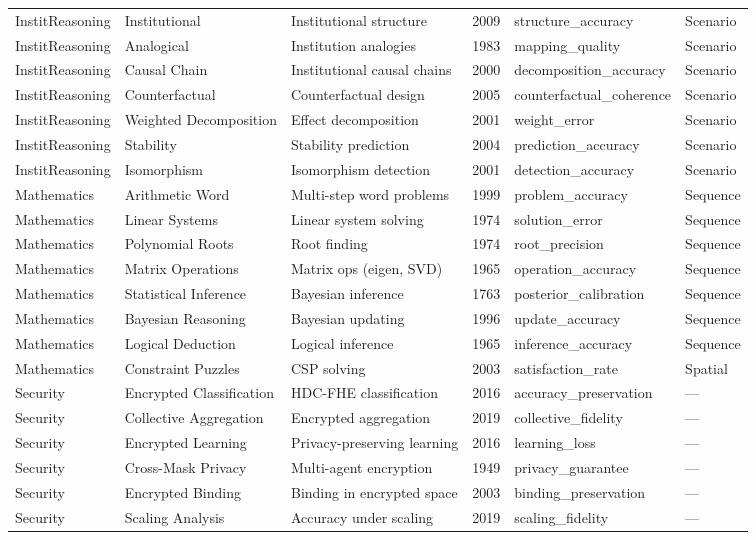 \documentclass[10pt,landscape]{article}
\begin{document}
\begin{longtable}{@{}p{2.3cm}p{3.0cm}p{4.5cm}p{0.6cm}p{3.8cm}p{1.8cm}@{}}
\midrule
InstitReasoning & Institutional & Institutional structure & 2009 & structure\_accuracy & Scenario \\
InstitReasoning & Analogical & Institution analogies & 1983 & mapping\_quality & Scenario \\
InstitReasoning & Causal Chain & Institutional causal chains & 2000 & decomposition\_accuracy & Scenario \\
InstitReasoning & Counterfactual & Counterfactual design & 2005 & counterfactual\_coherence & Scenario \\
InstitReasoning & Weighted Decomposition & Effect decomposition & 2001 & weight\_error & Scenario \\
InstitReasoning & Stability & Stability prediction & 2004 & prediction\_accuracy & Scenario \\
InstitReasoning & Isomorphism & Isomorphism detection & 2001 & detection\_accuracy & Scenario \\

\midrule
Mathematics & Arithmetic Word & Multi-step word problems & 1999 & problem\_accuracy & Sequence \\
Mathematics & Linear Systems & Linear system solving & 1974 & solution\_error & Sequence \\
Mathematics & Polynomial Roots & Root finding & 1974 & root\_precision & Sequence \\
Mathematics & Matrix Operations & Matrix ops (eigen, SVD) & 1965 & operation\_accuracy & Sequence \\
Mathematics & Statistical Inference & Bayesian inference & 1763 & posterior\_calibration & Sequence \\
Mathematics & Bayesian Reasoning & Bayesian updating & 1996 & update\_accuracy & Sequence \\
Mathematics & Logical Deduction & Logical inference & 1965 & inference\_accuracy & Sequence \\
Mathematics & Constraint Puzzles & CSP solving & 2003 & satisfaction\_rate & Spatial \\

\midrule
Security & Encrypted Classification & HDC-FHE classification & 2016 & accuracy\_preservation & --- \\
Security & Collective Aggregation & Encrypted aggregation & 2019 & collective\_fidelity & --- \\
Security & Encrypted Learning & Privacy-preserving learning & 2016 & learning\_loss & --- \\
Security & Cross-Mask Privacy & Multi-agent encryption & 1949 & privacy\_guarantee & --- \\
Security & Encrypted Binding & Binding in encrypted space & 2003 & binding\_preservation & --- \\
Security & Scaling Analysis & Accuracy under scaling & 2019 & scaling\_fidelity & --- \\


\end{longtable}
\end{document}
